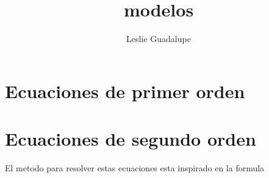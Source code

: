 \documentclass{article}
\title{modelos}
\author{Leslie Guadalupe}
\begin{document}
\maketitle

\section{Ecuaciones de primer orden}

\section{Ecuaciones de segundo orden}
El metodo para resolver estas ecuaciones esta inspirado en la formula
\end{document}
